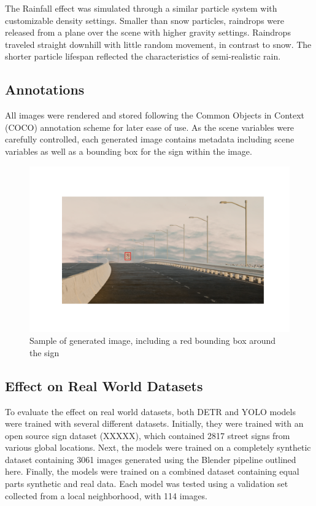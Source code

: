 \documentclass[journal]{IEEEtran}
\begin{document}
The Rainfall effect was simulated through a similar particle system with customizable density settings. Smaller than snow particles, raindrops were released from a plane over the scene with higher gravity settings. Raindrops traveled straight downhill with little random movement, in contrast to snow. The shorter particle lifespan reflected the characteristics of semi-realistic rain.

\subsection{Annotations}
All images were rendered and stored following the Common Objects in Context (COCO) annotation scheme for later ease of use. As the scene variables were carefully controlled, each generated image contains metadata including scene variables as well as a bounding box for the sign within the image. 

\begin{figure}[ht]
    \centering
    \includegraphics[width=\linewidth]{images/sign w box.png}
    \caption{Sample of generated image, including a red bounding box around the sign}
    \label{fig:row_of_images}
\end{figure}



\subsection{Effect on Real World Datasets}
To evaluate the effect on real world datasets, both DETR \cite{DETR} and YOLO\cite{glenn_jocher_2022_7347926} models were trained with several different datasets. Initially, they were trained with an open source sign dataset (XXXXX), which contained 2817 street signs from various global locations. Next, the models were trained on a completely synthetic dataset containing 3061 images generated using the Blender pipeline outlined here. Finally, the models were trained on a combined dataset containing equal parts synthetic and real data. Each model was tested using a validation set collected from a local neighborhood, with 114 images. 
\end{document}
